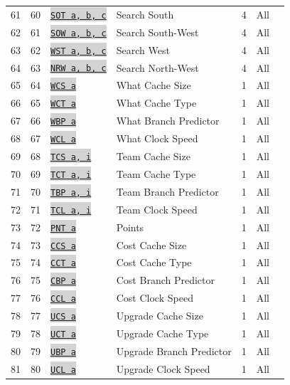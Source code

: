 \documentclass{article}
\newcommand{\vnscode}[1]{\colorbox{lightgray}{\lstinline[language=vns]{#1}}}
\begin{document}
\begin{longtable}{lllllll}
    61 & 60 & \hyperref[table:search]{\vnscode{SOT a, b, c}} & Search South & 4 & All \\
    62 & 61 & \hyperref[table:search]{\vnscode{SOW a, b, c}} & Search South-West & 4 & All \\
    63 & 62 & \hyperref[table:search]{\vnscode{WST a, b, c}} & Search West & 4 & All \\
    64 & 63 & \hyperref[table:search]{\vnscode{NRW a, b, c}} & Search North-West & 4 & All \\
    65 & 64 & \hyperref[table:upgrade]{\vnscode{WCS a}} & What Cache Size & 1 & All \\
    66 & 65 & \hyperref[table:upgrade]{\vnscode{WCT a}} & What Cache Type & 1 & All \\
    67 & 66 & \hyperref[table:upgrade]{\vnscode{WBP a}} & What Branch Predictor & 1 & All \\
    68 & 67 & \hyperref[table:upgrade]{\vnscode{WCL a}} & What Clock Speed & 1 & All \\
    69 & 68 & \hyperref[table:upgrade]{\vnscode{TCS a, i}} & Team Cache Size & 1 & All \\
    70 & 69 & \hyperref[table:upgrade]{\vnscode{TCT a, i}} & Team Cache Type & 1 & All \\
    71 & 70 & \hyperref[table:upgrade]{\vnscode{TBP a, i}} & Team Branch Predictor & 1 & All \\
    72 & 71 & \hyperref[table:upgrade]{\vnscode{TCL a, i}} & Team Clock Speed & 1 & All \\
    73 & 72 & \hyperref[table:resource]{\vnscode{PNT a}} & Points & 1 & All \\
    74 & 73 & \hyperref[table:upgrade]{\vnscode{CCS a}} & Cost Cache Size & 1 & All \\
    75 & 74 & \hyperref[table:upgrade]{\vnscode{CCT a}} & Cost Cache Type & 1 & All \\
    76 & 75 & \hyperref[table:upgrade]{\vnscode{CBP a}} & Cost Branch Predictor & 1 & All \\
    77 & 76 & \hyperref[table:upgrade]{\vnscode{CCL a}} & Cost Clock Speed & 1 & All \\
    78 & 77 & \hyperref[table:upgrade]{\vnscode{UCS a}} & Upgrade Cache Size & 1 & All \\
    79 & 78 & \hyperref[table:upgrade]{\vnscode{UCT a}} & Upgrade Cache Type & 1 & All \\
    80 & 79 & \hyperref[table:upgrade]{\vnscode{UBP a}} & Upgrade Branch Predictor & 1 & All \\
    81 & 80 & \hyperref[table:upgrade]{\vnscode{UCL a}} & Upgrade Clock Speed & 1 & All \\

\end{longtable}
\end{document}
